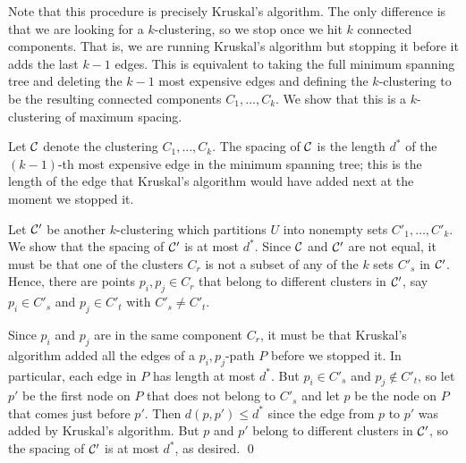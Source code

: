 Note that this procedure is precisely Kruskal's algorithm. The only difference 
is that we are looking for a $k$-clustering, so we stop once we hit $k$ 
connected components. That is, we 
are running Kruskal's algorithm but stopping it before it 
adds the last $k-1$ edges. This is equivalent to taking the 
full minimum spanning tree and deleting the $k-1$ most expensive edges 
and defining the $k$-clustering to be the resulting connected 
components $C_1, \dots, C_k$. We show that this is a 
$k$-clustering of maximum spacing.

\begin{pf} 
Let ${\cal C}$ denote the clustering 
$C_1, \dots, C_k$. The spacing of ${\cal C}$ is the length 
$d^*$ of the $(k-1)$-th most expensive edge in the minimum spanning tree; 
this is the length of the edge that Kruskal's algorithm would have added 
next at the moment we stopped it. 

Let ${\cal C}'$ be another $k$-clustering which partitions $U$ 
into nonempty sets $C'_1, \dots, C'_k$. We show that the spacing of ${\cal C}'$ 
is at most $d^*$.
Since ${\cal C}$ and ${\cal C}'$ are not equal, it must be that one of 
the clusters $C_r$ is not a subset of any of the $k$ sets $C'_s$ in ${\cal C}'$. 
Hence, there are points $p_i, p_j \in C_r$ that belong to different 
clusters in ${\cal C}'$, say $p_i \in C'_s$ and $p_j \in C'_t$ with 
$C'_s \neq C'_t$. 

Since $p_i$ and $p_j$ are in the same component $C_r$, it must be that 
Kruskal's algorithm added all the edges of a $p_i, p_j$-path $P$ 
before we stopped it. In particular, each edge in $P$ has length at most $d^*$. 
But $p_i \in C'_s$ and $p_j \notin C'_t$, so let $p'$ be the first 
node on $P$ that does not belong to $C'_s$ and let $p$ be the node on $P$
that comes just before $p'$. Then $d(p, p') \leq d^*$ since the edge 
from $p$ to $p'$ was added by Kruskal's algorithm. But $p$ and $p'$ 
belong to different clusters in ${\cal C}'$, so the spacing of ${\cal C}'$ 
is at most $d^*$, as desired. \qed 
\end{pf}